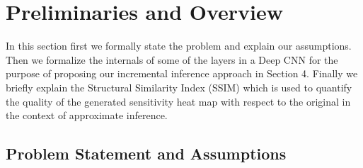 \section{Preliminaries and Overview}\label{sec:preliminaries}
In this section first we formally state the problem and explain our assumptions.
Then we formalize the internals of some of the layers in a Deep CNN for the purpose of proposing our incremental inference approach in Section 4. Finally we briefly explain the Structural Similarity Index (SSIM) which is used to quantify the quality of the generated sensitivity heat map with respect to the original in the context of approximate inference.

\subsection{Problem Statement and Assumptions}


